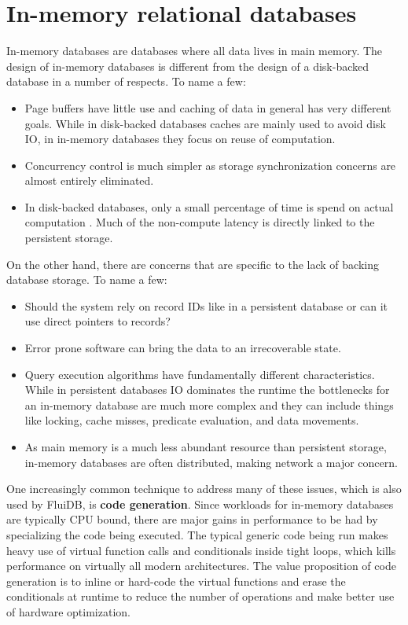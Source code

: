 \section{In-memory relational databases}

In-memory databases are databases where all data lives in main
memory. The design of in-memory databases is different from the design
of a disk-backed database in a number of respects. To name a few:

\begin{itemize}
\item Page buffers have little use and caching of data in general has very
different goals. While in disk-backed databases caches are mainly used to
avoid disk IO, in in-memory databases they focus on reuse of computation.
\item Concurrency control is much simpler as storage synchronization
concerns are almost entirely eliminated.
\item In disk-backed databases, only a small percentage of time is spend on
actual computation \cite{harizopoulosOLTPLookingGlass2018}. Much of
the non-compute latency is directly linked to the persistent
storage.
\end{itemize}

On the other hand, there are concerns that are specific to the lack of
backing database storage. To name a few:

\begin{itemize}
\item Should the system rely on record IDs like in a persistent database
or can it use direct pointers to records?
\item Error prone software can bring the data to an irrecoverable state.
\item Query execution algorithms have fundamentally different
characteristics. While in persistent databases IO dominates the
runtime the bottlenecks for an in-memory database are much more
complex and they can include things like locking, cache misses,
predicate evaluation, and data movements.
\item As main memory is a much less abundant resource than persistent
storage, in-memory databases are often distributed, making network a
major concern.
\end{itemize}

One increasingly common technique to address many of these issues,
which is also used by FluiDB, is \textbf{code generation}. Since workloads
for in-memory databases are typically CPU bound, there are major gains
in performance to be had by specializing the code being executed. The
typical generic code being run makes heavy use of virtual function
calls and conditionals inside tight loops, which kills performance on
virtually all modern architectures. The value proposition of code
generation is to inline or hard-code the virtual functions and erase
the conditionals at runtime to reduce the number of operations and
make better use of hardware optimization.

